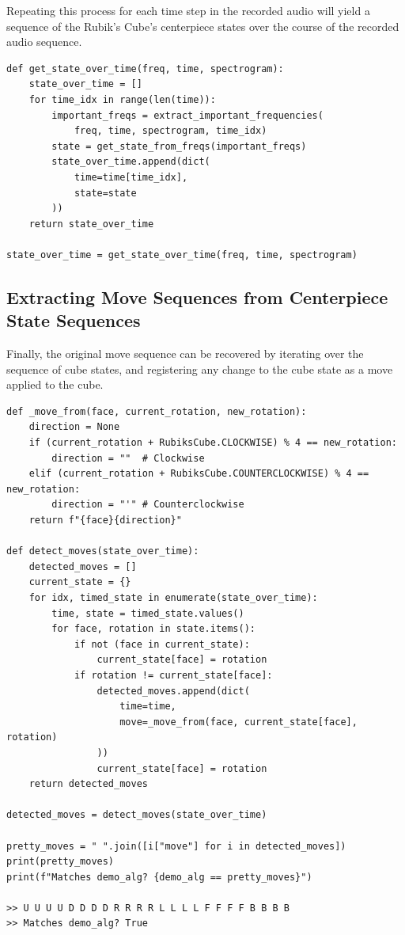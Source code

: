 Repeating this process for each time step in the recorded audio will yield a sequence of the Rubik's Cube's centerpiece states over the course of the recorded audio sequence.

\begin{verbatim}
def get_state_over_time(freq, time, spectrogram):
    state_over_time = []
    for time_idx in range(len(time)):
        important_freqs = extract_important_frequencies(
            freq, time, spectrogram, time_idx)
        state = get_state_from_freqs(important_freqs)
        state_over_time.append(dict(
            time=time[time_idx],
            state=state
        ))
    return state_over_time

state_over_time = get_state_over_time(freq, time, spectrogram)
\end{verbatim}

\newpage
\subsection{Extracting Move Sequences from Centerpiece State Sequences}
\label{subsec:extract-moves}
Finally, the original move sequence can be recovered by iterating over the sequence of cube states, and registering any change to the cube state as a move applied to the cube.

\begin{verbatim}
def _move_from(face, current_rotation, new_rotation):
    direction = None
    if (current_rotation + RubiksCube.CLOCKWISE) % 4 == new_rotation:
        direction = ""  # Clockwise
    elif (current_rotation + RubiksCube.COUNTERCLOCKWISE) % 4 == new_rotation:
        direction = "'" # Counterclockwise
    return f"{face}{direction}"

def detect_moves(state_over_time):
    detected_moves = []
    current_state = {}
    for idx, timed_state in enumerate(state_over_time):
        time, state = timed_state.values()
        for face, rotation in state.items():
            if not (face in current_state):
                current_state[face] = rotation
            if rotation != current_state[face]:
                detected_moves.append(dict(
                    time=time,
                    move=_move_from(face, current_state[face], rotation)
                ))
                current_state[face] = rotation
    return detected_moves

detected_moves = detect_moves(state_over_time)

pretty_moves = " ".join([i["move"] for i in detected_moves])
print(pretty_moves)   
print(f"Matches demo_alg? {demo_alg == pretty_moves}") 

>> U U U U D D D D R R R R L L L L F F F F B B B B
>> Matches demo_alg? True
\end{verbatim}

